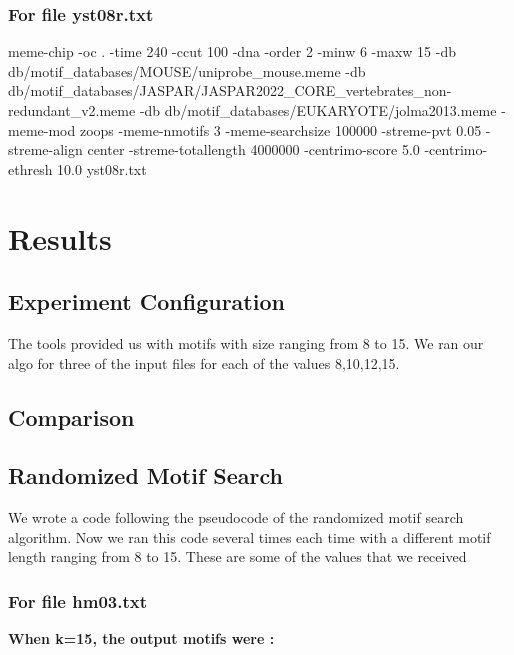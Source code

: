 \documentclass{report}
\begin{document}
\subsection{For file yst08r.txt}
meme-chip -oc . -time 240 -ccut 100 -dna -order 2 -minw 6 -maxw 15 -db db/motif_databases/MOUSE/uniprobe_mouse.meme -db db/motif_databases/JASPAR/JASPAR2022_CORE_vertebrates_non-redundant_v2.meme -db db/motif_databases/EUKARYOTE/jolma2013.meme -meme-mod zoops -meme-nmotifs 3 -meme-searchsize 100000 -streme-pvt 0.05 -streme-align center -streme-totallength 4000000 -centrimo-score 5.0 -centrimo-ethresh 10.0 yst08r.txt


\chapter{Results}


\section{Experiment Configuration}
The tools provided us with motifs with size ranging from 8 to 15. We ran our algo for three of the input files for each of the values 8,10,12,15.\\


\section{Comparison}
\section{Randomized Motif Search}
We wrote a code following the pseudocode of the randomized motif search algorithm. Now we ran this code several times each time with a different motif length ranging from 8 to 15. These are some of the values that we received
\subsection{For file hm03.txt}
\textbf{When k=15, the output motifs were :}\\
\end{document}
